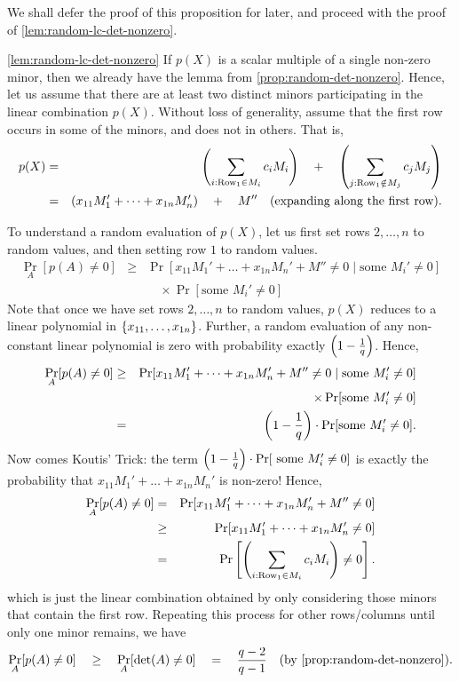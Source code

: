 We shall defer the proof of this proposition for later, and proceed
with the proof of \autoref{lem:random-lc-det-nonzero}.

\begin{proofof}{\autoref{lem:random-lc-det-nonzero}}
  If $p(X)$ is a scalar multiple of a single non-zero minor, then we
  already have the lemma from
  \autoref{prop:random-det-nonzero}. Hence, let us assume that
  there are at least two distinct minors participating in the linear
  combination $p(X)$. Without loss of generality, assume that the
  first row occurs in some of the minors, and does not in others. That is, 
  \begin{eqnarray*}
    p(X) &=& \left(\sum_{i:\text{Row}_1\in M_i} c_i M_i\right) \quad+ \quad \left(\sum_{j:\text{Row}_1\notin M_j} c_j M_j\right)\\
     & = & \left(x_{11} M_1' + \dots + x_{1n} M_{n}'\right) \quad+\quad M'' \quad\text{(expanding along the first row)}.
  \end{eqnarray*}
  
  To understand a random evaluation of $p(X)$, let us first set rows
  $2, \dots, n$ to random values, and then setting row $1$ to random
  values.
  \begin{eqnarray*}
    \Pr_{A}[p(A)\neq 0] & \geq & \Pr[x_{11} M_1' + \dots + x_{1n} M_n' + M'' \neq 0 \;|\; \text{some }M_{i}'\neq 0]\\
    & & \quad \times \Pr[\text{some }M_i' \neq 0]
  \end{eqnarray*}
  Note that once we have set rows $2,\dots, n$ to random values,
  $p(X)$ reduces to a linear polynomial in $\left\{x_{11},\dots,
    x_{1n}\right\}$. Further, a random evaluation of any non-constant linear
  polynomial is zero with probability exactly $\left(1
    -\frac{1}{q}\right)$. Hence,
  \begin{eqnarray*}
\Pr_{A}[p(A)\neq 0] & \geq & \Pr[x_{11} M_1' + \dots + x_{1n} M_n' + M'' \neq 0 \;|\; \text{some }M_{i}'\neq 0]\\
 & & \quad \times \Pr[\text{some }M_i' \neq 0]\\
    & = & \left(1 - \frac{1}{q}\right)\cdot \Pr[\text{some }M_i' \neq 0].
  \end{eqnarray*}
  Now comes  Koutis' Trick: the term $\left(1 -
    \frac{1}{q}\right) \cdot \Pr[\text{ some }M_i' \neq 0]$ is exactly the
  probability that $x_{11}M_1' + \dots + x_{1n}M_n'$ is non-zero! Hence,
\begin{eqnarray*}
\Pr_{A}[p(A) \neq 0] & = & \Pr[ x_{11}M_1' + \dots + x_{1n} M_n' + M''\neq 0]\\
 & \geq & \Pr[ x_{11}M_1' + \dots + x_{1n} M_n'\neq 0]\\
 & = & \Pr\left[\left(\sum_{i:\text{Row}_1\in M_i} c_i M_i\right) \neq 0\right].
\end{eqnarray*}
which is just the linear combination obtained by only considering
those minors that contain the first row. Repeating this process for other
rows/columns until only  one minor remains, we have
$$
\Pr_{A}[p(A) \neq 0] \quad \geq \quad \Pr_{A}[\det(A) \neq 0] \quad = \quad
\frac{q-2}{q-1}\quad(\text{by \autoref{prop:random-det-nonzero}}).
$$
\end{proofof}


